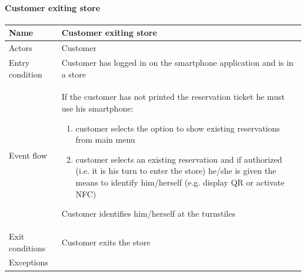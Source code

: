 \paragraph{Customer exiting store}
\begin{flushleft}
	\begin{tabular} { | m{3cm} | m{10cm} | }
		\hline
		Name & Customer exiting store\\
		\hline
		Actors & Customer\\
		\hline
		Entry condition & Customer has logged in on the smartphone application and is in a store\\
		\hline
		Event flow &
		If the customer has not printed the reservation ticket he must use his smartphone:
		\begin{enumerate}
			\item customer selects the option to show existing reservations from main menu
			\item customer selects an existing reservation and if authorized (i.e. it is his turn to enter the store) he/she is given the means to identify him/herself (e.g. display QR or activate NFC)
		\end{enumerate}
	    Customer identifies him/herself at the turnstiles\\
		\hline
		Exit conditions & Customer exits the store\\
		\hline
		Exceptions & \\
		\hline
	\end{tabular}
\end{flushleft}


